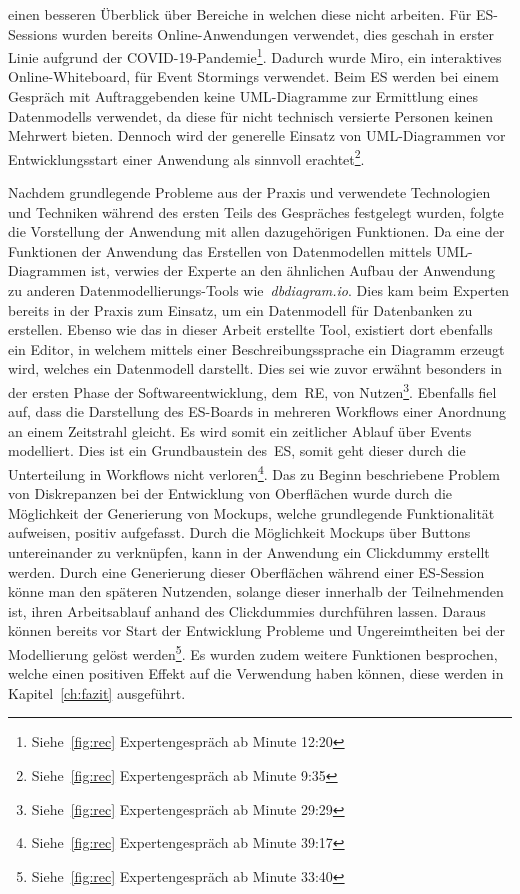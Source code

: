 einen besseren Überblick über Bereiche in welchen diese nicht arbeiten.\newline
Für \ac{ES}-Sessions wurden bereits Online-Anwendungen verwendet, dies geschah in erster Linie aufgrund der COVID-19-Pandemie\footnote{Siehe~\ref{fig:rec} Expertengespräch ab Minute  12:20}.
Dadurch wurde Miro, ein interaktives Online-Whiteboard, für Event Stormings verwendet.\newline
Beim \ac{ES} werden bei einem Gespräch mit Auftraggebenden keine \ac{UML}-Diagramme zur Ermittlung eines Datenmodells verwendet,
da diese für nicht technisch versierte Personen keinen Mehrwert bieten.
Dennoch wird der generelle Einsatz von \ac{UML}-Diagrammen vor Entwicklungsstart einer Anwendung als sinnvoll erachtet\footnote{Siehe~\ref{fig:rec} Expertengespräch ab Minute  9:35}.

Nachdem grundlegende Probleme aus der Praxis und verwendete Technologien und Techniken während des ersten Teils des Gespräches festgelegt wurden,
folgte die Vorstellung der Anwendung mit allen dazugehörigen Funktionen.
Da eine der Funktionen der Anwendung das Erstellen von Datenmodellen mittels \ac{UML}-Diagrammen ist, verwies der Experte an den ähnlichen Aufbau der Anwendung
zu anderen Datenmodellierungs-Tools wie~\textit{dbdiagram.io}.
Dies kam beim Experten bereits in der Praxis zum Einsatz, um ein Datenmodell für Datenbanken zu erstellen.
Ebenso wie das in dieser Arbeit erstellte Tool, existiert dort ebenfalls ein Editor, in welchem mittels einer Beschreibungssprache ein Diagramm erzeugt wird,
welches ein Datenmodell darstellt.
Dies sei wie zuvor erwähnt besonders in der ersten Phase der Softwareentwicklung, dem~\ac{RE}, von Nutzen\footnote{Siehe~\ref{fig:rec} Expertengespräch ab Minute  29:29}.\newline
Ebenfalls fiel auf, dass die Darstellung des \ac{ES}-Boards in mehreren Workflows einer Anordnung an einem Zeitstrahl gleicht.
Es wird somit ein zeitlicher Ablauf über Events modelliert.
Dies ist ein Grundbaustein des~\ac{ES}, somit geht dieser durch die Unterteilung in Workflows nicht verloren\footnote{Siehe~\ref{fig:rec} Expertengespräch ab Minute  39:17}.\newline
Das zu Beginn beschriebene Problem von Diskrepanzen bei der Entwicklung von Oberflächen wurde durch die Möglichkeit der Generierung von
Mockups, welche grundlegende Funktionalität aufweisen, positiv aufgefasst.
Durch die Möglichkeit Mockups über Buttons untereinander zu verknüpfen, kann in der Anwendung ein Clickdummy erstellt werden.
Durch eine Generierung dieser Oberflächen während einer \ac{ES}-Session könne man den späteren Nutzenden, solange dieser innerhalb der Teilnehmenden ist,
ihren Arbeitsablauf anhand des Clickdummies durchführen lassen.
Daraus können bereits vor Start der Entwicklung Probleme und Ungereimtheiten bei der Modellierung gelöst werden\footnote{Siehe~\ref{fig:rec} Expertengespräch ab Minute  33:40}.\newline
Es wurden zudem weitere Funktionen besprochen, welche einen positiven Effekt auf die Verwendung haben können, diese werden in Kapitel~\ref{ch:fazit} ausgeführt.
